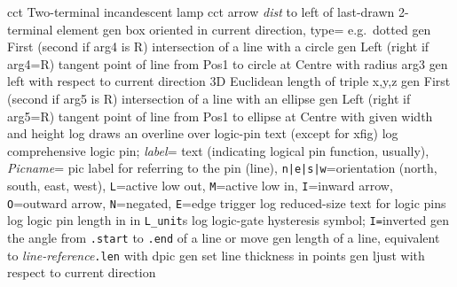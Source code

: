   {cct}
  {Two-terminal incandescent lamp
   }
  {cct}
  {arrow {\sl dist} to left of last-drawn 2-terminal element
   }
  {gen}
  {box oriented in current direction, type= e.g.\ dotted}
  {gen}
  { First (second if arg4 is R) intersection of a line with a circle}
  {gen}
  { Left (right if arg4=R) tangent point of line
     from Pos1 to circle at Centre with radius arg3}
  {gen}
  {left with respect to current direction }
  {3D}
  {Euclidean length of triple x,y,z}
  {gen}
  { First (second if arg5 is R) intersection of a line with an ellipse}
  {gen}
  { Left (right if arg5=R) tangent point of line
     from Pos1 to ellipse at Centre with given width and height}
  {log}
  {draws an overline over logic-pin text (except for xfig)}
  {log}
  {comprehensive logic pin;
   {\sl label}= text (indicating logical pin function, usually),
   {\sl Picname}= pic label for referring to the pin (line),
   {\tt n|e|s|w}=orientation (north, south, east, west),
   {\tt L}=active low out,
   {\tt M}=active low in,
   {\tt I}=inward arrow,
   {\tt O}=outward arrow,
   {\tt N}=negated,
   {\tt E}=edge trigger}
  {log}
  {reduced-size text for logic pins}
  {log}
  {logic pin length in in {\tt L\_unit}s}
  {log}
  {logic-gate hysteresis symbol; {\tt I=}inverted}
  {gen}
  {the angle from {\tt .start} to {\tt .end} of a line or move}
  {gen}
  {length of a line, equivalent to {\sl line-reference}{\tt .len}
   with dpic}
  {gen}
  {set line thickness in points}
  {gen}
  {ljust with respect to current direction}
